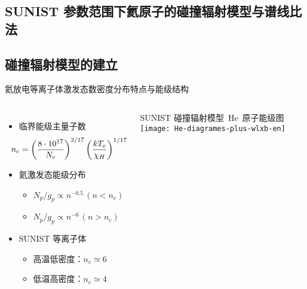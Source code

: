 \begin{CJK*}{UTF8}{kai}
\section{SUNIST 参数范围下氦原子的碰撞辐射模型与谱线比法}

\subsection{碰撞辐射模型的建立}

%

\begin{frame}{氦放电等离子体激发态数密度分布特点与能级结构}
	\begin{columns}
			\begin{itemize}
				\item 临界能级主量子数\\ 
					\[
					\hspace{-1em}
					n_c=\left(\frac{8\cdot10^{17}}{N_e}\right)^{2/17}
        			\left(\frac{kT_e}{\chi_H}\right)^{1/17}
        			\]
        		\item 氦激发态能级分布\\ 
        			\begin{itemize}
						\item $N_p/g_p\propto n^{-0.5}\,(n<n_c)$
						\item $N_p/g_p\propto n^{-6}\,(n>n_c)$
					\end{itemize}
				\item SUNIST 等离子体
					\begin{itemize}
						\item 高温低密度：$n_c\simeq 6$
						\item 低温高密度：$n_c\simeq 4$
					\end{itemize}
			\end{itemize}
			\centering
			SUNIST 碰撞辐射模型~He~原子能级图\\
			\texttt{[image: He-diagrames-plus-wlxb-en]}
	\end{columns}
\end{frame}


\end{CJK*}
